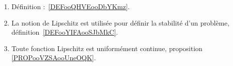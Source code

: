 
	\label{THEMEooFonctionsLipschitz}
\begin{enumerate}
	\item
	      Définition :~\ref{DEFooQHVEooDbYKmz}.
	\item
	      La notion de Lipschitz est utilisée pour définir la stabilité d'un problème, définition~\ref{DEFooYIFAooSJbMkC}.
      \item 
          Toute fonction Lipschitz est uniformément continue, proposition \ref{PROPooVZSAooUneOQK}.
\end{enumerate}

